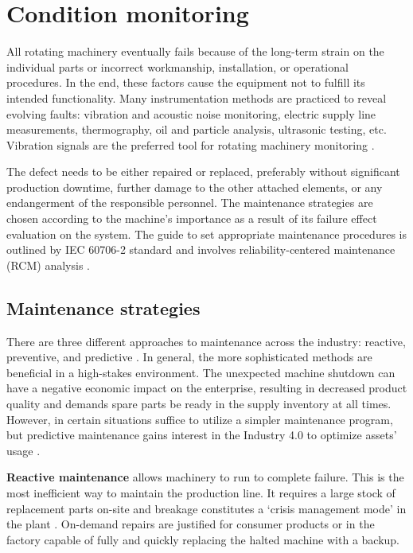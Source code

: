\section{Condition monitoring}
All rotating machinery eventually fails because of the long-term strain on the individual parts or incorrect workmanship, installation, or operational procedures. In the end, these factors cause the equipment not to fulfill its intended functionality. Many instrumentation methods are practiced to reveal evolving faults: vibration and acoustic noise monitoring, electric supply line measurements, thermography, oil and particle analysis, ultrasonic testing, etc. Vibration signals are the preferred tool for rotating machinery monitoring \cite{mohanty_machinery_2015}. 

The defect needs to be either repaired or replaced, preferably without significant production downtime, further damage to the other attached elements, or any endangerment of the responsible personnel. The maintenance strategies are chosen according to the machine's importance as a result of its failure effect evaluation on the system. The guide to set appropriate maintenance procedures is outlined by IEC 60706-2 standard and involves reliability-centered maintenance (RCM) analysis \cite{el-thalji_predictive_2019}.

\subsection{Maintenance strategies}
There are three different approaches to maintenance across the industry: reactive, preventive, and predictive \cite{scheffer_practical_2004}. In general, the more sophisticated methods are beneficial in a high-stakes environment. The unexpected machine shutdown can have a negative economic impact on the enterprise, resulting in decreased product quality and demands spare parts be ready in the supply inventory at all times. However, in certain situations suffice to utilize a simpler maintenance program, but predictive maintenance gains interest in the Industry 4.0 to optimize assets' usage  \cite{cinar_machine_2020}.
\bigbreak

\textbf{Reactive maintenance} allows machinery to run to complete failure. This is the most inefficient way to maintain the production line. It requires a large stock of replacement parts on-site and breakage constitutes a `crisis management mode' in the plant \cite{scheffer_practical_2004}. On-demand repairs are justified for consumer products or in the factory capable of fully and quickly replacing the halted machine with a backup. 
\bigbreak

